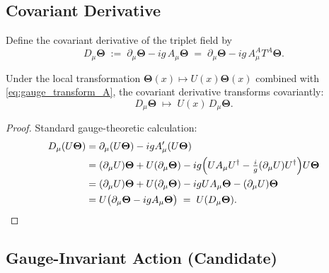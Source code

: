 \subsection{Covariant Derivative}

\begin{definition}
  \label{def:covariant_derivative}
  Define the covariant derivative of the triplet field by
  \begin{equation}
    \label{eq:covariant_derivative}
    D_\mu\boldsymbol{\Theta}
    \;:=\;
    \partial_\mu\boldsymbol{\Theta} - ig\,A_\mu\boldsymbol{\Theta}
    \;=\;
    \partial_\mu\boldsymbol{\Theta} - ig\,A_\mu^A T^A\boldsymbol{\Theta}.
  \end{equation}
\end{definition}

\begin{proposition}
  \label{prop:covariance}
  Under the local transformation
  $\boldsymbol{\Theta}(x)\mapsto U(x)\boldsymbol{\Theta}(x)$ combined with
  \eqref{eq:gauge_transform_A}, the covariant derivative transforms
  covariantly:
  \begin{equation}
    D_\mu\boldsymbol{\Theta} \;\mapsto\; U(x)\,D_\mu\boldsymbol{\Theta}.
  \end{equation}
\end{proposition}

\begin{proof}
  Standard gauge-theoretic calculation:
  \begin{align}
    D_\mu(U\boldsymbol{\Theta})
    &= \partial_\mu(U\boldsymbol{\Theta}) - igA_\mu'(U\boldsymbol{\Theta})
    \nonumber\\
    &= (\partial_\mu U)\boldsymbol{\Theta} + U(\partial_\mu\boldsymbol{\Theta})
      - ig\Bigl(UA_\mu U^\dagger - \tfrac{i}{g}(\partial_\mu U)U^\dagger\Bigr)
      U\boldsymbol{\Theta}
    \nonumber\\
    &= (\partial_\mu U)\boldsymbol{\Theta} + U(\partial_\mu\boldsymbol{\Theta})
      - igUA_\mu\boldsymbol{\Theta}
      - (\partial_\mu U)\boldsymbol{\Theta}
    \nonumber\\
    &= U\bigl(\partial_\mu\boldsymbol{\Theta} - igA_\mu\boldsymbol{\Theta}\bigr)
    \;=\; U(D_\mu\boldsymbol{\Theta}).
  \end{align}
\end{proof}

\subsection{Gauge-Invariant Action (Candidate)}

